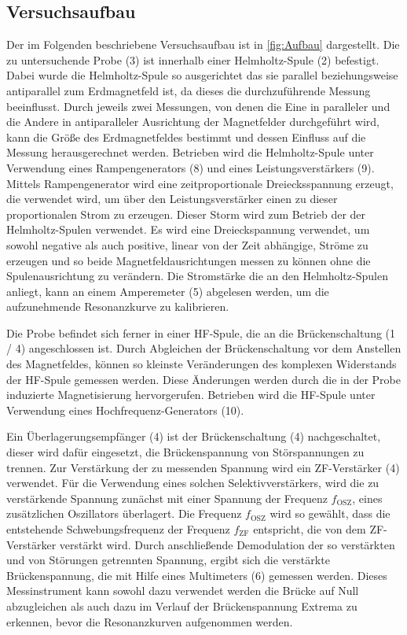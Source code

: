 \subsection{Versuchsaufbau}

Der im Folgenden beschriebene Versuchsaufbau ist in \cref{fig:Aufbau} dargestellt.
Die zu untersuchende Probe (3) ist innerhalb einer Helmholtz-Spule (2) befestigt. Dabei wurde die Helmholtz-Spule so 
ausgerichtet das sie parallel beziehungsweise antiparallel zum Erdmagnetfeld ist, da dieses die durchzuführende 
Messung beeinflusst. Durch jeweils zwei Messungen, von denen die Eine in paralleler und die Andere in antiparalleler Ausrichtung der Magnetfelder durchgeführt wird, kann die Größe des Erdmagnetfeldes bestimmt und dessen Einfluss auf die Messung herausgerechnet werden.
Betrieben wird die Helmholtz-Spule unter Verwendung eines Rampengenerators (8) und eines Leistungsverstärkers (9). Mittels Rampengenerator
wird eine zeitproportionale Dreiecksspannung erzeugt, die verwendet wird, um über den Leistungsverstärker einen zu dieser proportionalen Strom
zu erzeugen. Dieser Storm wird zum Betrieb der der Helmholtz-Spulen verwendet. Es wird eine Dreieckspannung verwendet, um sowohl negative 
als auch positive, linear von der Zeit abhängige, Ströme zu erzeugen und so beide Magnetfeldausrichtungen messen zu können ohne die 
Spulenausrichtung zu verändern. Die Stromstärke die an den Helmholtz-Spulen anliegt, kann an einem Amperemeter (5) abgelesen werden,
um die aufzunehmende Resonanzkurve zu kalibrieren.

Die Probe befindet sich ferner in einer HF-Spule, die an die Brückenschaltung (1 / 4) angeschlossen ist. Durch Abgleichen der Brückenschaltung 
vor dem Anstellen des Magnetfeldes, können so kleinste Veränderungen des komplexen Widerstands der HF-Spule gemessen werden. Diese Änderungen 
werden durch die in der Probe induzierte Magnetisierung hervorgerufen.
Betrieben wird die HF-Spule unter Verwendung eines Hochfrequenz-Generators (10). 

Ein Überlagerungsempfänger (4) ist der Brückenschaltung (4) nachgeschaltet, dieser wird
dafür eingesetzt, die Brückenspannung von Störspannungen zu trennen. Zur Verstärkung der zu messenden Spannung wird ein ZF-Verstärker (4)
verwendet. Für die Verwendung eines solchen Selektivverstärkers, wird die zu verstärkende Spannung zunächst mit einer Spannung der Frequenz 
$f_{\text{OSZ}}$, eines zusätzlichen Oszillators überlagert. Die Frequenz $f_{\text{OSZ}}$ wird so gewählt, dass die entstehende 
Schwebungsfrequenz der Frequenz $f_{\text{ZF}}$ entspricht, die von dem ZF-Verstärker verstärkt wird. Durch anschließende Demodulation der so 
verstärkten und von Störungen getrennten 
Spannung, ergibt sich die verstärkte Brückenspannung, die mit Hilfe eines Multimeters (6) gemessen werden. Dieses
Messinstrument kann sowohl dazu verwendet werden die Brücke auf Null abzugleichen als auch dazu im Verlauf der Brückenspannung Extrema zu erkennen, bevor die Resonanzkurven aufgenommen werden.

